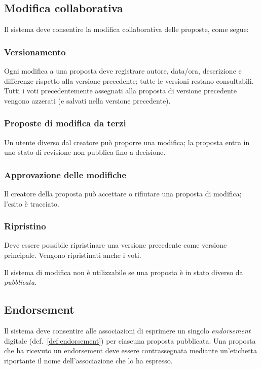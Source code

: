 \begin{rfscope}
\subsection{Modifica collaborativa} \label{rf:modificacollaborativa}
Il sistema deve consentire la modifica collaborativa delle proposte, come segue:

\subsubsection{Versionamento} \label{rf:versionamento}
Ogni modifica a una proposta deve registrare autore, data/ora, descrizione e differenze rispetto alla versione precedente; tutte le versioni restano consultabili. Tutti i voti precedentemente assegnati alla proposta di versione precedente vengono azzerati (e salvati nella versione precedente).
\subsubsection{Proposte di modifica da terzi} \label{rf:modificadaterzi}
Un utente diverso dal creatore può proporre una modifica; la proposta entra in uno stato di revisione non pubblica fino a decisione.
\subsubsection{Approvazione delle modifiche} \label{rf:approvazionemodifiche}
Il creatore della proposta può accettare o rifiutare una proposta di modifica; l’esito è tracciato.
\subsubsection{Ripristino} \label{rf:ripristinoproposta}
Deve essere possibile ripristinare una versione precedente come versione principale. Vengono ripristinati anche i voti.

Il sistema di modifica non è utilizzabile se una proposta è in stato diverso da \emph{pubblicata}.

\subsection{Endorsement} \label{rf:endorsement}
Il sistema deve consentire alle associazioni di esprimere un singolo \emph{endorsement} digitale (def.~\ref{def:endorsement}) per ciascuna proposta pubblicata.
Una proposta che ha ricevuto un endorsement deve essere contrassegnata mediante un’etichetta riportante il nome dell’associazione che lo ha espresso.


\end{rfscope}
